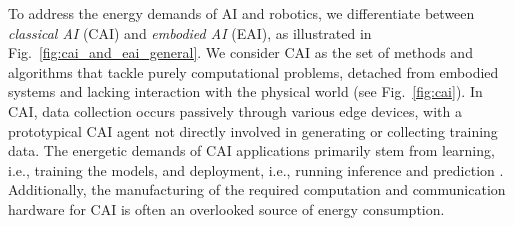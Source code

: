 \documentclass[12pt]{article}
\begin{document}
To address the energy demands of AI and robotics, we differentiate between \textit{classical AI} (CAI) and \textit{embodied AI} (EAI), as illustrated in Fig.~\ref{fig:cai_and_eai_general}. We consider CAI as the set of methods and algorithms that tackle purely computational problems, detached from embodied systems and lacking interaction with the physical world (see Fig.~\ref{fig:cai}). In CAI, data collection occurs passively through various edge devices, with a prototypical CAI agent not directly involved in generating or collecting training data. The energetic demands of CAI applications primarily stem from learning, i.e., training the models, and deployment, i.e., running inference and prediction \cite{Vries2023growingenergyfootprint}. Additionally, the manufacturing of the required computation and communication hardware for CAI is often an overlooked source of energy consumption. 
\end{document}

